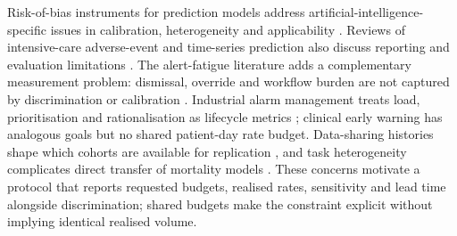 Risk-of-bias instruments for prediction models address artificial-intelligence-specific issues in calibration, heterogeneity and applicability \citep{moons2025probastai}. Reviews of intensive-care adverse-event and time-series prediction also discuss reporting and evaluation limitations \citep{wang2026deep,hernandezdiaz2026deep,swinckels2024deep}. The alert-fatigue literature adds a complementary measurement problem: dismissal, override and workflow burden are not captured by discrimination or calibration \citep{ray2026alert,khan2026qualitative,jaidev2026sepsis}. Industrial alarm management treats load, prioritisation and rationalisation as lifecycle metrics \citep{parsa2021enhancing,drg2021quality}; clinical early warning has analogous goals but no shared patient-day rate budget. Data-sharing histories shape which cohorts are available for replication \citep{clifford2026from}, and task heterogeneity complicates direct transfer of mortality models \citep{xu2025diagnosisbased,papareddy2025transforming}. These concerns motivate a protocol that reports requested budgets, realised rates, sensitivity and lead time alongside discrimination; shared budgets make the constraint explicit without implying identical realised volume.
